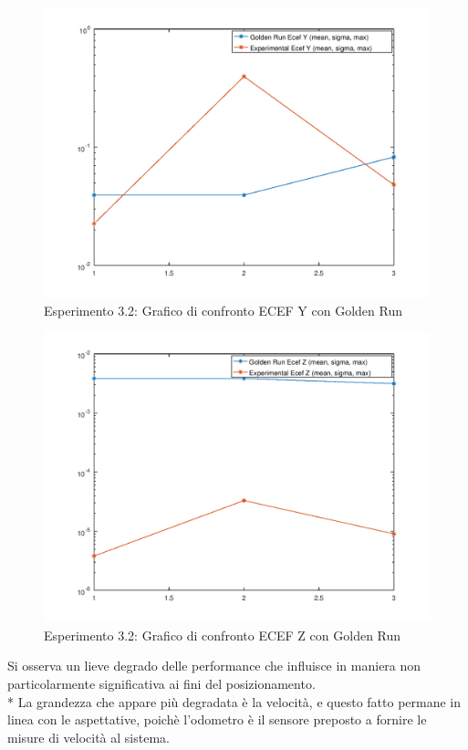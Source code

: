 \begin{figure}[h]
	\centering
	\includegraphics[width=0.7\linewidth]{img/exp12ecefY}
	\caption{Esperimento 3.2: Grafico di confronto ECEF Y con Golden Run}
\end{figure}
\begin{figure}[h]
	\centering
	\includegraphics[width=0.7\linewidth]{img/exp12ecefZ}
	\caption{Esperimento 3.2: Grafico di confronto ECEF Z con Golden Run}
\end{figure}
\FloatBarrier
Si osserva un lieve degrado delle performance che influisce in maniera non particolarmente significativa ai fini del posizionamento.\\*
La grandezza che appare pi\`u degradata \`e la velocit\`a, e questo fatto permane in linea con le aspettative, poich\`e l'odometro \`e il sensore preposto a fornire le misure di velocit\`a al sistema.
